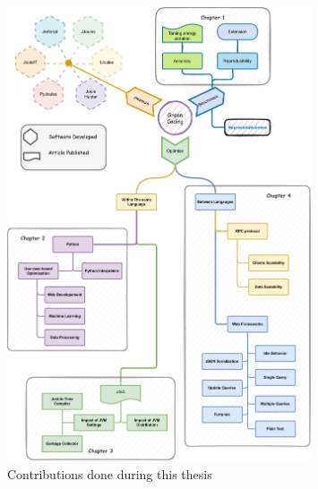 
\begin{figure}[!h]
    \centering
    \includegraphics[width=0.8\textwidth,height=\textheight,keepaspectratio]{chapters/thesis_contributions.pdf}
    \caption{Contributions done during this thesis }
    \label{fig:thesis_contributions}
\end{figure}


